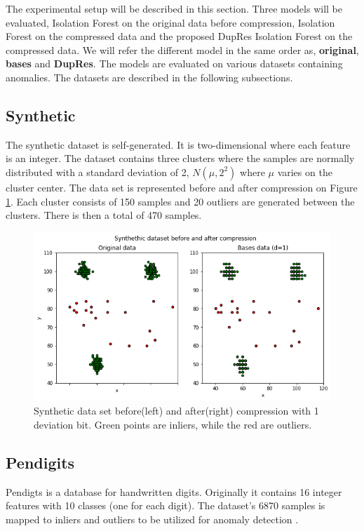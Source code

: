 The experimental setup will be described in this section. Three models will be evaluated, Isolation Forest on the original data before compression, Isolation Forest on the compressed data and the proposed DupRes Isolation Forest on the compressed data. We will refer the different model in the same order as, \textbf{original}, \textbf{bases} and \textbf{DupRes}. The models are evaluated on various datasets containing anomalies. The datasets are described in the following subsections.

\subsection*{Synthetic}
The synthetic dataset is self-generated. It is two-dimensional where each feature is an integer. The dataset contains three clusters where the samples are normally distributed with a standard deviation of 2, $N(\mu, 2^2)$ where $\mu$ varies on the cluster center. The data set is represented before and after compression on Figure \ref{fig:synthetic-dataset}. Each cluster consists of 150 samples and 20 outliers are generated between the clusters. There is then a total of 470 samples.

\begin{figure}
  \centering
  \includegraphics[width=\linewidth]{images/synthethic-dataset.png}
  \caption{Synthetic data set before(left) and after(right) compression with 1 deviation bit. Green points are inliers, while the red are outliers. }
  \label{fig:synthetic-dataset}
\end{figure}

\subsection*{Pendigits}
Pendigts is a database for handwritten digits. Originally it contains 16 integer features  with 10 classes (one for each digit). The dataset's 6870 samples is mapped to inliers and outliers to be utilized for anomaly detection \cite{ODDS}.

